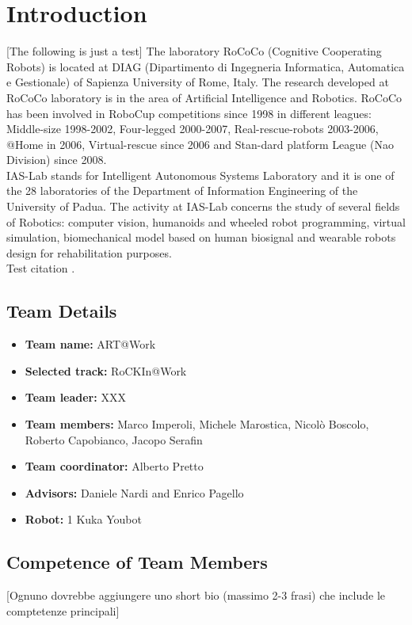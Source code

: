 \documentclass[conference]{IEEEtran}
\begin{document}
\section{Introduction}
[The following is just a test] The laboratory RoCoCo (Cognitive Cooperating Robots) is located at DIAG (Dipartimento di Ingegneria Informatica, Automatica e Gestionale) of Sapienza University of Rome, Italy.
The research developed at RoCoCo laboratory is in the area of Artificial Intelligence and Robotics. RoCoCo has been involved in RoboCup competitions since 1998 in different leagues: Middle-size 1998-2002, Four-legged 2000-2007, Real-rescue-robots 2003-2006, @Home in 2006, Virtual-rescue since 2006 and Stan-dard platform League (Nao Division) since 2008.\\
IAS-Lab stands for Intelligent Autonomous Systems Laboratory and it is one of the 28 laboratories of the Department of Information Engineering of the University of Padua.
The activity at IAS-Lab concerns the study of several fields of Robotics: computer vision, humanoids and wheeled robot programming, virtual simulation, biomechanical model based on human biosignal and wearable robots design for rehabilitation purposes.\\

Test citation \cite{thrunburgardfox2005}.\\

\subsection{Team Details}
\begin{itemize}
 \item \textbf{Team name:} ART@Work
 \item \textbf{Selected track:} RoCKIn@Work
 \item \textbf{Team leader:} XXX
 \item \textbf{Team members:} Marco Imperoli, Michele Marostica, Nicolò Boscolo, Roberto Capobianco, Jacopo Serafin
 \item \textbf{Team coordinator:} Alberto Pretto
 \item \textbf{Advisors:} Daniele Nardi and Enrico Pagello 
 \item \textbf{Robot:} 1 Kuka Youbot
\end{itemize}

\subsection{Competence of Team Members}
[Ognuno dovrebbe aggiungere uno short bio (massimo 2-3 frasi) che include le comptetenze principali]
\end{document}
